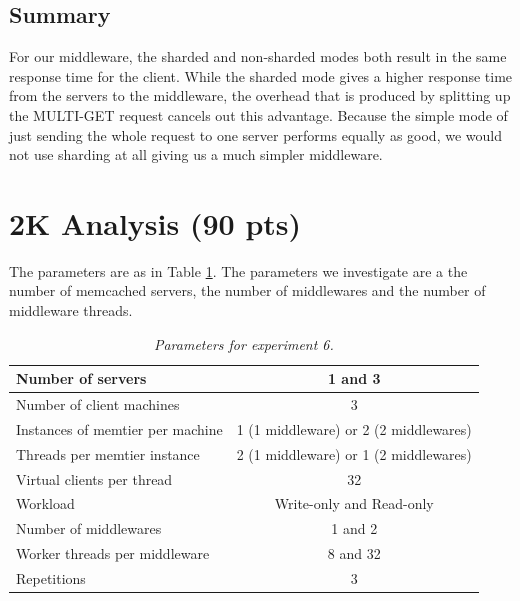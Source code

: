 \documentclass[11pt,a4paper]{article}
\begin{document}
\subsection{Summary}

For our middleware, the sharded and non-sharded modes both result in the same response time for the client. While the sharded mode gives a higher response time from the servers to the middleware, the overhead that is produced by splitting up the MULTI-GET request cancels out this advantage. Because the simple mode of just sending the whole request to one server performs equally as good, we would not use sharding at all giving us a much simpler middleware.

\section{2K Analysis (90 pts)}

The parameters are as in Table \ref{Table:6_table}. The parameters we investigate are a the number of memcached servers, the number of middlewares and the number of middleware threads.

\begin{table}[H]
	\centering
		\begin{tabular}{|l|c|}
			\hline Number of servers                				& 1 and 3                                     \\ 
			\hline Number of client machines        		& 3                                           \\ 
			\hline Instances of memtier per machine 	& 1 (1 middleware) or 2 (2 middlewares)                                           \\ 
			\hline Threads per memtier instance     		& 2 (1 middleware) or 1 (2 middlewares)                                          \\
			\hline Virtual clients per thread       			& 32                                     \\ 
			\hline Workload                         					& Write-only and Read-only \\
			\hline Number of middlewares            		& 1 and 2                                     \\
			\hline Worker threads per middleware    	& 8 and 32                                    \\
			\hline Repetitions                      					& 3                                 \\ 
			\hline 
		\end{tabular}
	\caption{\textit{Parameters for experiment 6.}}
	\label{Table:6_table}
\end{table}
\end{document}
